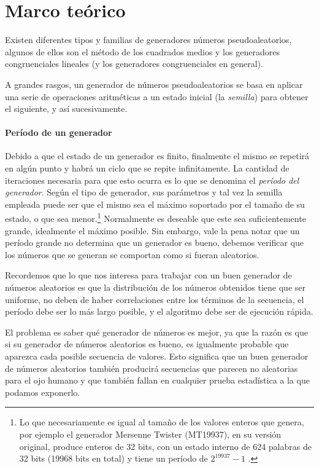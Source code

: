\section{Marco teórico}
Existen diferentes tipos y familias de generadores números pseudoaleatorios, algunos de ellos son el método de los cuadrados medios y los generadores congruenciales lineales (y los generadores congruenciales en general).

A grandes rasgos, un generador de números pseudoaleatorios se basa en aplicar una serie de operaciones aritméticas a un estado inicial (la \emph{semilla}) para obtener el siguiente, y así sucesivamente.

\paragraph{Período de un generador}
Debido a que el estado de un generador es finito, finalmente el mismo se repetirá en algún punto y habrá un ciclo que se repite infinitamente. La cantidad de iteraciones necesaria para que esto ocurra es lo que se denomina el \emph{período del generador}. Según el tipo de generador, sus parámetros y tal vez la semilla empleada puede ser que el mismo sea el máximo soportado por el tamaño de su estado, o que sea menor.\footnote{Lo que necesariamente es igual al tamaño de los valores enteros que genera, por ejemplo el generador Mersenne Twister (MT19937), en su versión original, produce enteros de 32 bits, con un estado interno de 624 palabras de 32 bits (19968 bits en total) y tiene un período de $2^{19937}-1$ \cite{matsumoto1998mersenne}.} Normalmente es deseable que este sea suficientemente grande, idealmente el máximo posible. Sin embargo, vale la pena notar que un período grande no determina que un generador es bueno, debemos verificar que los números que se generan se comportan como si fueran aleatorios.

Recordemos que lo que nos interesa para trabajar con un buen generador de números aleatorios es que la distribución de los números obtenidos tiene que ser uniforme, no deben de haber correlaciones entre los términos de la secuencia, el período debe ser lo más largo posible, y el algoritmo debe ser de ejecución rápida.

El problema es saber qué generador de números es mejor, ya que la razón es que si su generador de números aleatorios es bueno, es igualmente probable que aparezca cada posible secuencia de valores. Esto significa que un buen generador de números aleatorios también producirá secuencias que parecen no aleatorias para el ojo humano y que también fallan en cualquier prueba estadística a la que podamos exponerlo.

